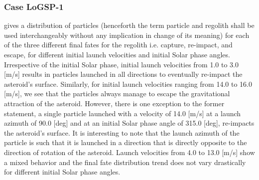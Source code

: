 \subsubsection{Case LoGSP-1}
\label{LoGSP-1}
 gives a distribution of particles (henceforth the term particle and regolith shall be used interchangeably without any implication in change of its meaning) for each of the three different final fates for the regolith i.e. capture, re-impact, and escape, for different initial launch velocities and initial Solar phase angles. Irrespective of the initial Solar phase, initial launch velocities from 1.0 to 3.0 [m/s] results in particles launched in all directions to eventually re-impact the asteroid's surface. Similarly, for initial launch velocities ranging from 14.0 to 16.0 [m/s], we see that the particles always manage to escape the gravitational attraction of the asteroid. However, there is one exception to the former statement, a single particle launched with a velocity of 14.0 [m/s] at a launch azimuth of 90.0 [deg] and at an initial Solar phase angle of 315.0 [deg], re-impacts the asteroid's surface. It is interesting to note that the launch azimuth of the particle is such that it is launched in a direction that is directly opposite to the direction of rotation of the asteroid. Launch velocities from 4.0 to 13.0 [m/s] show a mixed behavior and the final fate distribution trend does not vary drastically for different initial Solar phase angles.

